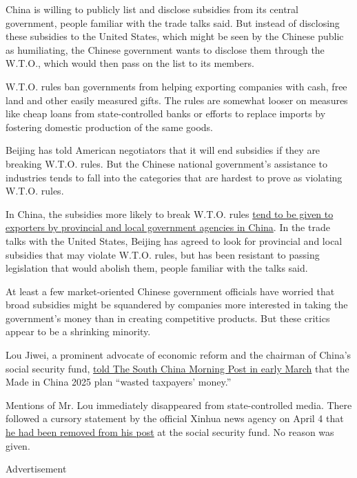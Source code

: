 China is willing to publicly list and disclose subsidies from its
central government, people familiar with the trade talks said. But
instead of disclosing these subsidies to the United States, which might
be seen by the Chinese public as humiliating, the Chinese government
wants to disclose them through the W.T.O., which would then pass on the
list to its members.

W.T.O. rules ban governments from helping exporting companies with cash,
free land and other easily measured gifts. The rules are somewhat looser
on measures like cheap loans from state-controlled banks or efforts to
replace imports by fostering domestic production of the same goods.

Beijing has told American negotiators that it will end subsidies if they
are breaking W.T.O. rules. But the Chinese national government's
assistance to industries tends to fall into the categories that are
hardest to prove as violating W.T.O. rules.

In China, the subsidies more likely to break W.T.O. rules
\href{https://www.nytimes.com/2010/09/09/business/global/09trade.html}{tend
to be given to exporters by provincial and local government agencies in
China}. In the trade talks with the United States, Beijing has agreed to
look for provincial and local subsidies that may violate W.T.O. rules,
but has been resistant to passing legislation that would abolish them,
people familiar with the talks said.

At least a few market-oriented Chinese government officials have worried
that broad subsidies might be squandered by companies more interested in
taking the government's money than in creating competitive products. But
these critics appear to be a shrinking minority.

Lou Jiwei, a prominent advocate of economic reform and the chairman of
China's social security fund,
\href{https://www.scmp.com/news/china/diplomacy/article/2189046/chinas-tech-strategy-all-talk-no-action-and-waste-taxpayers}{told
The South China Morning Post in early March} that the Made in China 2025
plan ``wasted taxpayers' money.''

Mentions of Mr. Lou immediately disappeared from state-controlled media.
There followed a cursory statement by the official Xinhua news agency on
April 4 that
\href{http://www.xinhuanet.com/politics/2019-04/04/c_1124326653.htm}{he
had been removed from his post} at the social security fund. No reason
was given.

Advertisement

